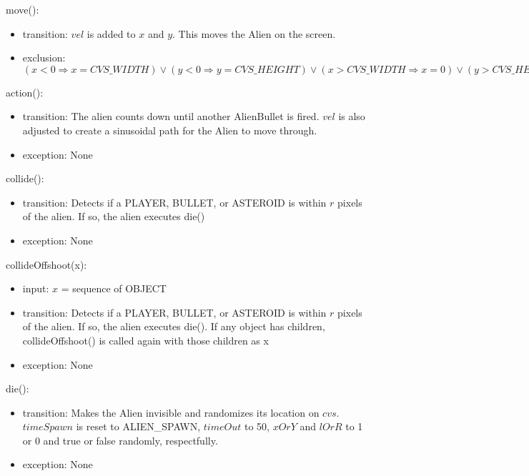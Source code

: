 \documentclass[12pt]{article}
\begin{document}
\noindent move():
\begin{itemize}
  \item transition: $vel$ is added to $x$ and $y$. This moves the Alien on the screen.
  \item exclusion: $(x < 0 \Rightarrow x = CVS\_WIDTH) \lor (y < 0 \Rightarrow y = CVS\_HEIGHT) \lor (x > CVS\_WIDTH \Rightarrow x = 0) \lor (y > CVS\_HEIGHT \Rightarrow y = 0)$
\end{itemize}

\noindent action():
\begin{itemize}
  \item transition: The alien counts down until another AlienBullet is fired. $vel$ is also adjusted to create a sinusoidal path for the Alien to move through.
  \item exception: None
\end{itemize}

\noindent collide():
\begin{itemize}
  \item transition: Detects if a PLAYER, BULLET, or ASTEROID is within $r$ pixels of the alien. If so, the alien executes die()
  \item exception: None
\end{itemize}

\noindent collideOffshoot(x):
\begin{itemize}
  \item input: $x$ = sequence of OBJECT
  \item transition: Detects if a PLAYER, BULLET, or ASTEROID is within $r$ pixels of the alien. If so, the alien executes die(). If any object has children, collideOffshoot() is called again with those children as x
  \item exception: None
\end{itemize}

\noindent die():
\begin{itemize}
  \item transition: Makes the Alien invisible and randomizes its location on $cvs$. $timeSpawn$ is reset to ALIEN\_SPAWN, $timeOut$ to 50, $xOrY$ and $lOrR$ to 1 or 0 and true or false randomly, respectfully.
  \item exception: None
\end{itemize}

\newpage
\end{document}
